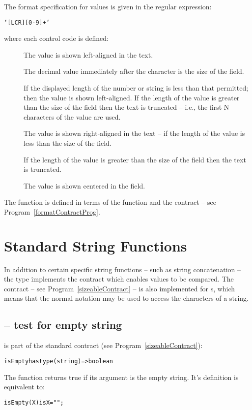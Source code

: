 The format specification for  values is given in the regular expression:
\begin{alltt}
`[LCR][0-9]+`
\end{alltt}
where each control code is defined:
\begin{description}
\item[] 
The value is shown left-aligned in the text.

The decimal value immediately after the  character is the size of the field.

If the displayed length of the number or string is less than that permitted; then the value is shown left-aligned. If the length of the value is greater than the size of the field then the text is truncated -- i.e., the first N characters of the value are used.

\item[] The value is shown right-aligned in the text -- if the length of the value is less than the size of the field.

If the length of the value is greater than the size of the field then the text is truncated.

\item[] The value is shown centered in the field. 
\end{description}

\begin{aside}
The  function is defined in terms of the  function and the  contract -- see Program~\vref{formatContractProg}.
\end{aside}

\section{Standard String Functions}
\label{simpleString}
In addition to certain specific string functions -- such as string concatenation -- the  type implements the  contract which enables  values to be compared. The  contract -- see Program~\vref{sizeableContract} -- is also implemented for s, which means that the normal \q{[]} notation may be used to access the characters of a string.

\subsection{ -- test for empty string}
\label{stringEmptyFunction}
 is part of the standard  contract (see Program~\vref{sizeableContract}):
\begin{alltt}
isEmpty has type (string)=>boolean
\end{alltt}
The  function returns true if its argument is the empty string. It's definition is equivalent to:
\begin{alltt}
isEmpty(X) is X="";
\end{alltt}

